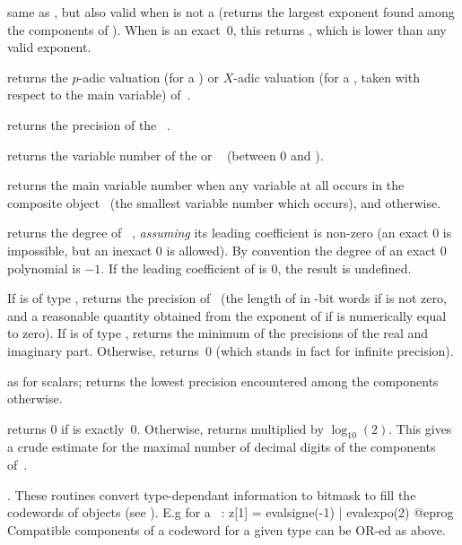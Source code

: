  same as , but also valid when 
is not a  (returns the largest exponent found among the components
of ). When  is an exact~0, this returns
\hbox{}, which is lower than any valid exponent.

 returns the $p$-adic valuation (for
a ) or $X$-adic valuation (for a , taken with respect to
the main variable) of~.

 returns the precision of the ~.

 returns the variable number of the
 or ~ (between 0 and ).

 returns the main variable number when any variable
at all occurs in the composite object~ (the smallest variable number
which occurs), and  otherwise.

 returns the degree of ~,
\emph{assuming} its leading coefficient is non-zero (an exact $0$ is
impossible, but an inexact $0$ is allowed). By convention the degree of an
exact $0$ polynomial is $-1$. If the leading coefficient of  is $0$,
the result is undefined.

 If  is of type , returns the
precision of~ (the length of  in \B-bit words if  is not
zero, and a reasonable quantity obtained from the exponent of  if
 is numerically equal to zero). If  is of type ,
returns the minimum of the precisions of the real and imaginary part.
Otherwise, returns~0 (which stands in fact for infinite precision).

 as  for scalars; returns the
lowest precision encountered among the components otherwise.

 returns 0 if  is exactly~0. Otherwise,
returns  multiplied by $\log_{10}(2)$. This gives a crude
estimate for the maximal number of decimal digits of the components
of~.

.
These routines convert type-dependant information to bitmask to fill the
codewords of  objects (see ). E.g for a
~:
\bprog
  z[1] = evalsigne(-1) | evalexpo(2)
@eprog
Compatible components of a codeword for a given type can be OR-ed as above.

